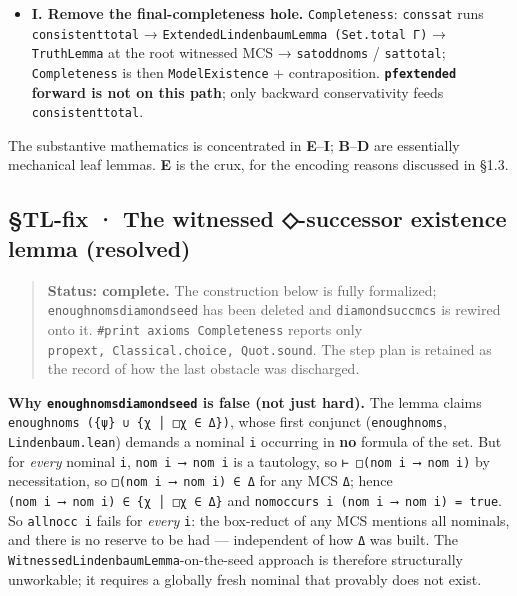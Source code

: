 \documentclass[11pt,a4paper]{article}
\renewcommand{\_}{\origtextunderscore\allowbreak}
\begin{document}
\begin{itemize}
\item
  \textbf{I. Remove the final-completeness hole.} \texttt{Completeness}: \texttt{cons\_sat} runs \texttt{consistent\_total} → \texttt{ExtendedLindenbaumLemma\ (Set.total\ Γ)} → \texttt{TruthLemma} at the root witnessed MCS → \texttt{sat\_odd\_noms\textquotesingle{}} / \texttt{sat\_total}; \texttt{Completeness} is then \texttt{ModelExistence} + contraposition. \textbf{\texttt{pf\_extended} forward is not on this path}; only backward conservativity feeds \texttt{consistent\_total}.
\end{itemize}

The substantive mathematics is concentrated in \textbf{E}--\textbf{I}; \textbf{B}--\textbf{D} are essentially mechanical leaf lemmas. \textbf{E} is the crux, for the encoding reasons discussed in §1.3.

\hypertarget{tl-fix-the-witnessed--successor-existence-lemma-resolved}{%
\subsection{§TL-fix · The witnessed ◇-successor existence lemma (resolved)}\label{tl-fix-the-witnessed--successor-existence-lemma-resolved}}

\begin{quote}
\textbf{Status: complete.} The construction below is fully formalized; \texttt{enough\_noms\_diamond\_seed} has been deleted and \texttt{diamond\_succ\_mcs} is rewired onto it. \texttt{\#print\ axioms\ Completeness} reports only \texttt{propext,\ Classical.choice,\ Quot.sound}. The step plan is retained as the record of how the last obstacle was discharged.
\end{quote}

\textbf{Why \texttt{enough\_noms\_diamond\_seed} is false (not just hard).} The lemma claims \texttt{enough\_noms\ (\{ψ\}\ ∪\ \{χ\ │\ □χ\ ∈\ Δ\})}, whose first conjunct (\texttt{enough\_noms}, \texttt{Lindenbaum.lean}) demands a nominal \texttt{i} occurring in \textbf{no} formula of the set. But for \emph{every} nominal \texttt{i}, \texttt{nom\ i\ ⟶\ nom\ i} is a tautology, so \texttt{⊢\ □(nom\ i\ ⟶\ nom\ i)} by necessitation, so \texttt{□(nom\ i\ ⟶\ nom\ i)\ ∈\ Δ} for any MCS \texttt{Δ}; hence \texttt{(nom\ i\ ⟶\ nom\ i)\ ∈\ \{χ\ │\ □χ\ ∈\ Δ\}} and \texttt{nom\_occurs\ i\ (nom\ i\ ⟶\ nom\ i)\ =\ true}. So \texttt{all\_nocc\ i} fails for \emph{every} \texttt{i}: the box-reduct of any MCS mentions all nominals, and there is no reserve to be had --- independent of how \texttt{Δ} was built. The \texttt{WitnessedLindenbaumLemma}-on-the-seed approach is therefore structurally unworkable; it requires a globally fresh nominal that provably does not exist.
\end{document}
